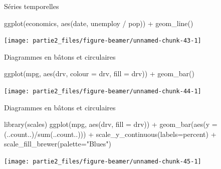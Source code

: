 \documentclass[12pt,ignorenonframetext,]{beamer}
\newenvironment{Shaded}{}{}
\newcommand{\DataTypeTok}[1]{#1}
\newcommand{\KeywordTok}[1]{\textcolor[rgb]{0.00,0.00,1.00}{#1}}
\newcommand{\NormalTok}[1]{#1}
\newcommand{\OperatorTok}[1]{#1}
\newcommand{\StringTok}[1]{\textcolor[rgb]{0.00,0.50,0.50}{#1}}
\renewenvironment{Shaded}{\begin{snugshade}}{\end{snugshade}}
\begin{document}
\begin{frame}[fragile]{Séries temporelles}
\protect\hypertarget{series-temporelles}{}

\footnotesize \center

\begin{Shaded}
\begin{Highlighting}[]
\KeywordTok{ggplot}\NormalTok{(economics, }\KeywordTok{aes}\NormalTok{(date, unemploy }\OperatorTok{/}\StringTok{ }\NormalTok{pop)) }\OperatorTok{+}
\StringTok{  }\KeywordTok{geom_line}\NormalTok{()}
\end{Highlighting}
\end{Shaded}

\texttt{[image: partie2\_files/figure-beamer/unnamed-chunk-43-1]}

\end{frame}

\begin{frame}[fragile]{Diagrammes en bâtons et circulaires}
\protect\hypertarget{diagrammes-en-batons-et-circulaires-4}{}

\footnotesize \center

\begin{Shaded}
\begin{Highlighting}[]
\KeywordTok{ggplot}\NormalTok{(mpg, }\KeywordTok{aes}\NormalTok{(drv, }\DataTypeTok{colour =}\NormalTok{ drv, }\DataTypeTok{fill =}\NormalTok{ drv)) }\OperatorTok{+}\StringTok{ }
\StringTok{  }\KeywordTok{geom_bar}\NormalTok{()}
\end{Highlighting}
\end{Shaded}

\texttt{[image: partie2\_files/figure-beamer/unnamed-chunk-44-1]}

\end{frame}

\begin{frame}[fragile]{Diagrammes en bâtons et circulaires}
\protect\hypertarget{diagrammes-en-batons-et-circulaires-5}{}

\footnotesize \center

\begin{Shaded}
\begin{Highlighting}[]
\KeywordTok{library}\NormalTok{(scales)}
\KeywordTok{ggplot}\NormalTok{(mpg, }\KeywordTok{aes}\NormalTok{(drv, }\DataTypeTok{fill =}\NormalTok{ drv)) }\OperatorTok{+}\StringTok{ }
\StringTok{  }\KeywordTok{geom_bar}\NormalTok{(}\KeywordTok{aes}\NormalTok{(}\DataTypeTok{y =}\NormalTok{ (..count..)}\OperatorTok{/}\KeywordTok{sum}\NormalTok{(..count..))) }\OperatorTok{+}
\StringTok{  }\KeywordTok{scale_y_continuous}\NormalTok{(}\DataTypeTok{labels=}\NormalTok{percent) }\OperatorTok{+}
\StringTok{  }\KeywordTok{scale_fill_brewer}\NormalTok{(}\DataTypeTok{palette=}\StringTok{"Blues"}\NormalTok{)}
\end{Highlighting}
\end{Shaded}

\texttt{[image: partie2\_files/figure-beamer/unnamed-chunk-45-1]}

\end{frame}
\end{document}
